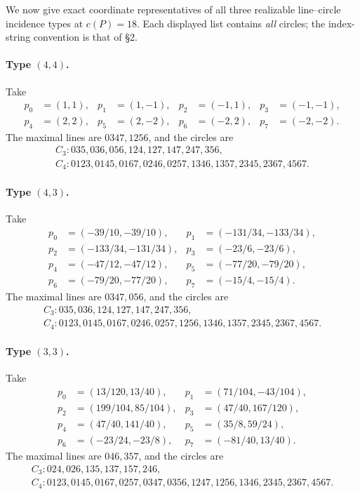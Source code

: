 \documentclass[11pt,a4paper]{article}
\theoremstyle{definition}
\begin{document}
We now give exact coordinate representatives of all three realizable
line--circle incidence types at $c(P)=18$.  Each displayed list contains
\emph{all} circles; the index-string convention is that of \S2.

\paragraph{Type $(4,4)$.}
Take
\[
\begin{aligned}
p_0&=(1,1),&p_1&=(1,-1),&p_2&=(-1,1),&p_3&=(-1,-1),\\
p_4&=(2,2),&p_5&=(2,-2),&p_6&=(-2,2),&p_7&=(-2,-2).
\end{aligned}
\]
The maximal lines are $0347,1256$, and the circles are
\[
\begin{gathered}
C_3: 035,036,056,124,127,147,247,356,\\
C_4: 0123,0145,0167,0246,0257,1346,1357,2345,2367,4567.
\end{gathered}
\]

\paragraph{Type $(4,3)$.}
Take
\[
\begin{aligned}
p_0&=(-39/10,-39/10),&p_1&=(-131/34,-133/34),\\
p_2&=(-133/34,-131/34),&p_3&=(-23/6,-23/6),\\
p_4&=(-47/12,-47/12),&p_5&=(-77/20,-79/20),\\
p_6&=(-79/20,-77/20),&p_7&=(-15/4,-15/4).
\end{aligned}
\]
The maximal lines are $0347,056$, and the circles are
\[
\begin{gathered}
C_3: 035,036,124,127,147,247,356,\\
C_4: 0123,0145,0167,0246,0257,1256,1346,1357,2345,2367,4567.
\end{gathered}
\]

\paragraph{Type $(3,3)$.}
Take
\[
\begin{aligned}
p_0&=(13/120,13/40),&p_1&=(71/104,-43/104),\\
p_2&=(199/104,85/104),&p_3&=(47/40,167/120),\\
p_4&=(47/40,141/40),&p_5&=(35/8,59/24),\\
p_6&=(-23/24,-23/8),&p_7&=(-81/40,13/40).
\end{aligned}
\]
The maximal lines are $046,357$, and the circles are
\[
\begin{gathered}
C_3: 024,026,135,137,157,246,\\
C_4: 0123,0145,0167,0257,0347,0356,1247,1256,1346,2345,2367,4567.
\end{gathered}
\]
\end{document}
